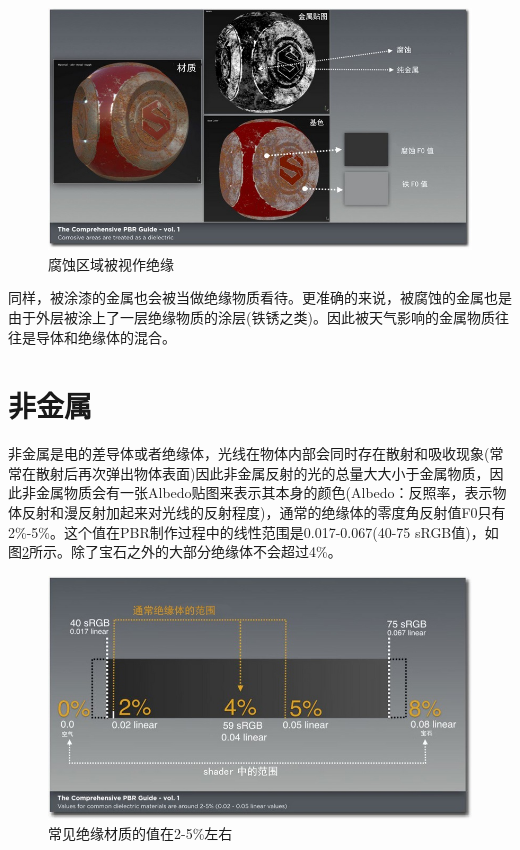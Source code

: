 \begin{figure}[ht]
    \centering
	\includegraphics[width=\textwidth]{images/chap1_13.jpg}
	\caption{腐蚀区域被视作绝缘}
    \label{fig:chap1_13}
\end{figure}

同样，被涂漆的金属也会被当做绝缘物质看待。更准确的来说，被腐蚀的金属也是由于外层被涂上了一层绝缘物质的涂层(铁锈之类)。因此被天气影响的金属物质往往是导体和绝缘体的混合。

\section{非金属}

非金属是电的差导体或者绝缘体，光线在物体内部会同时存在散射和吸收现象(常常在散射后再次弹出物体表面)因此非金属反射的光的总量大大小于金属物质，因此非金属物质会有一张Albedo贴图来表示其本身的颜色(Albedo：反照率，表示物体反射和漫反射加起来对光线的反射程度)，通常的绝缘体的零度角反射值F0只有2\%-5\%。这个值在PBR制作过程中的线性范围是0.017-0.067(40-75 sRGB值)，如图\ref{fig:chap1_14}所示。除了宝石之外的大部分绝缘体不会超过4\%。

\begin{figure}[ht]
    \centering
	\includegraphics[width=\textwidth]{images/chap1_14.jpg}
	\caption{常见绝缘材质的值在2-5\%左右}
    \label{fig:chap1_14}
\end{figure}

